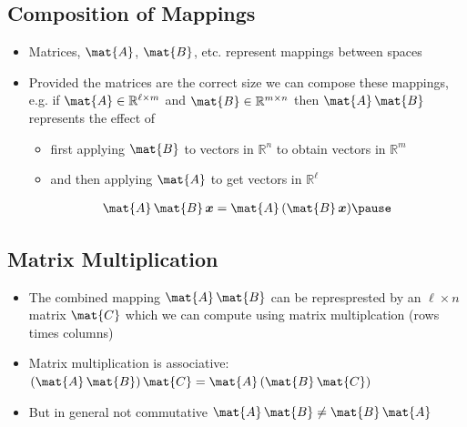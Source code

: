 \begin{slide}
\section{Composition of Mappings}

\begin{PauseHighLight}
  \begin{itemize}
  \item Matrices, $\mat{A}$, $\mat{B}$, etc. represent mappings
    between spaces\pause
  \item Provided the matrices are the correct size we can compose
    these mappings,  e.g. if $\mat{A} \in \mathbb{R}^{\ell \times m}$
    and $\mat{B} \in \mathbb{R}^{m\times n}$ then $\mat{A} \, \mat{B}$
    represents the effect of
    \begin{itemize}
    \item first applying $\mat{B}$ to vectors in $\mathbb{R}^n$ to
      obtain vectors in $\mathbb{R}^m$\pause
    \item and then applying $\mat{A}$ to get vectors in $\mathbb{R}^{\ell}$
    \end{itemize}
    \begin{align*}
      \mat{A}\, \mat{B} \, \bm{x} = \mat{A} \,(\mat{B}\, \bm{x})\pause
    \end{align*}
  \end{itemize}
\end{PauseHighLight}

\end{slide}



\begin{slide}
\section[-2]{Matrix Multiplication}

\pb
\begin{itemize}
\item The combined mapping $\mat{A}\,\mat{B}$ can be represprested
  by an $\ell \times n$ matrix $\mat{C}$ which we can compute using
  matrix multiplcation (rows times columns)\pause
  \begin{center}
    \pause
  \end{center}
\item Matrix multiplication is associative: $(\mat{A}\,\mat{B})\,\mat{C} = \mat{A}\, (\mat{B}\, \mat{C})$\pause
\item But in general not commutative $\mat{A}\,\mat{B} \neq \mat{B}\, \mat{A}$\pause
\end{itemize}

\end{slide}

